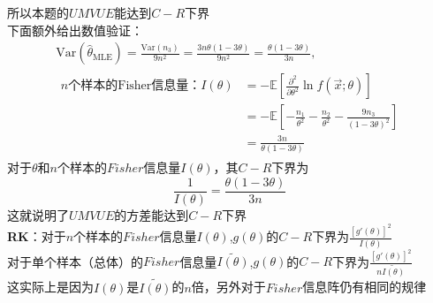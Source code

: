 \documentclass[UTF8,openany]{book}
\begin{document}
	所以本题的$UMVUE$能达到$C-R$下界\\
	下面额外给出数值验证：\\
	\begin{gather}
		\text{Var}(\hat{\theta}_{\text{MLE}}) = \frac{\text{Var}(n_3)}{9n^2} = \frac{3n\theta(1-3\theta)}{9n^2} = \frac{\theta(1-3\theta)}{3n}, \\
		\begin{aligned}
			n \text{个样本的Fisher信息量：} I(\theta) &= -\mathbb{E}\left[ \frac{\partial^2}{\partial\theta^2} \ln f(\vec{x};\theta) \right]\\
			&=-\mathbb{E}[-\frac{n_1}{\theta^2}-\frac{n_2}{\theta^2}-\frac{9n_3}{(1-3\theta)^2}]\\
			&=\frac{3n}{\theta(1-3\theta)}
		\end{aligned}
	\end{gather}
	对于$\theta$和$n$个样本的$Fisher$信息量$I(\theta)$，其$C-R$下界为$$\frac{1}{I(\theta)}=\frac{\theta(1-3\theta)}{3n}$$这就说明了$UMVUE$的方差能达到$C-R$下界\\
	\textbf{RK}：对于$n$个样本的$Fisher$信息量$I(\theta)$,$g(\theta)$的$C-R$下界为$\frac{[g'(\theta)]^2}{I(\theta)}$\\
	对于单个样本（总体）的$Fisher$信息量$\widetilde{I(\theta)}$,$g(\theta)$的$C-R$下界为$\frac{[g'(\theta)]^2}{n\widetilde{I(\theta)}}$\\
	这实际上是因为$I(\theta)$是$\widetilde{I(\theta)}$的$n$倍，另外对于$Fisher$信息阵仍有相同的规律\\
	
\end{document}
